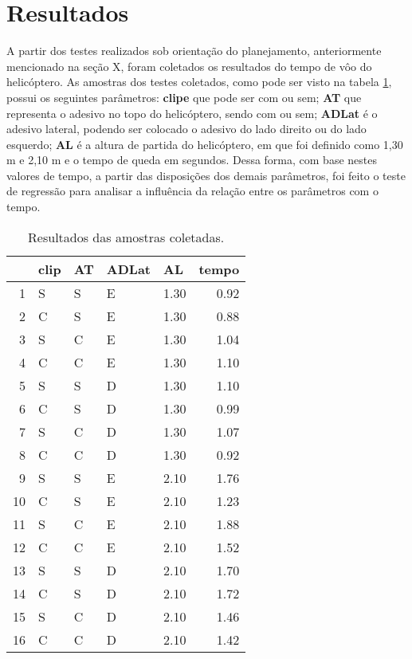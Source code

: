 \section{Resultados}

A partir dos testes realizados sob orientação do planejamento, anteriormente mencionado na seção X, foram coletados os resultados do tempo de vôo do helicóptero. As amostras dos testes coletados, como pode ser visto na tabela \ref{tab:amostras}, possui os seguintes parâmetros: \textbf{clipe} que pode ser com ou sem; \textbf{AT} que representa o adesivo no topo do helicóptero, sendo com ou sem; \textbf{ADLat} é o adesivo lateral, podendo ser colocado o adesivo do lado direito ou do lado esquerdo; \textbf{AL} é a altura de partida do helicóptero, em que foi definido como 1,30 m e 2,10 m e o tempo de queda em segundos. Dessa forma, com base nestes valores de tempo, a partir das disposições dos demais parâmetros, foi feito o teste de regressão para analisar a influência da relação entre os parâmetros com o tempo.

\begin{table}[ht]
    \centering
    \caption{Resultados das amostras coletadas.}
    \begin{tabular}{rllllr}
      \hline
     & clip & AT & ADLat & AL & tempo \\ 
      \hline
    1 & S & S & E & 1.30 & 0.92 \\ 
      2 & C & S & E & 1.30 & 0.88 \\ 
      3 & S & C & E & 1.30 & 1.04 \\ 
      4 & C & C & E & 1.30 & 1.10 \\ 
      5 & S & S & D & 1.30 & 1.10 \\ 
      6 & C & S & D & 1.30 & 0.99 \\ 
      7 & S & C & D & 1.30 & 1.07 \\ 
      8 & C & C & D & 1.30 & 0.92 \\ 
      9 & S & S & E & 2.10 & 1.76 \\ 
      10 & C & S & E & 2.10 & 1.23 \\ 
      11 & S & C & E & 2.10 & 1.88 \\ 
      12 & C & C & E & 2.10 & 1.52 \\ 
      13 & S & S & D & 2.10 & 1.70 \\ 
      14 & C & S & D & 2.10 & 1.72 \\ 
      15 & S & C & D & 2.10 & 1.46 \\ 
      16 & C & C & D & 2.10 & 1.42 \\ 
       \hline
    \end{tabular}
    \label{tab:amostras}
\end{table}

